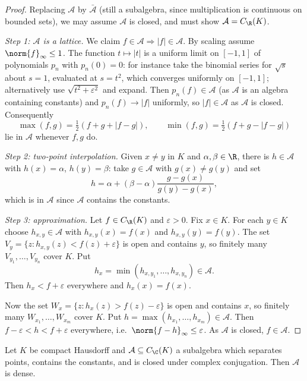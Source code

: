 \begin{proof}
	Replacing $\mathcal A$ by $\bar{\mathcal A}$ (still a subalgebra, since multiplication is continuous on bounded sets), we may assume $\mathcal{A}$ is closed, and must show $\mathcal{A} = C_\R(K)$.

	\emph{Step 1: $\mathcal A$ is a lattice.} We claim $f \in \mathcal{A} \Rightarrow |f| \in \mathcal{A}$. By scaling assume $\norm{f}_\infty \leq 1$. The function $t \mapsto |t|$ is a uniform limit on $[-1,1]$ of polynomials $p_n$ with $p_n(0)=0$: for instance take the binomial series for $\sqrt{s}$ about $s=1$, evaluated at $s = t^2$, which converges uniformly on $[-1,1]$; alternatively use $\sqrt{t^2 + \varepsilon^2}$ and expand. Then $p_n(f) \in \mathcal A$ (as $\mathcal A$ is an algebra containing constants) and $p_n(f)\to|f|$ uniformly, so $|f| \in \mathcal A$ as $\mathcal A$ is closed. Consequently
	$$\max(f,g) = \tfrac12(f+g+|f-g|), \qquad \min(f,g)=\tfrac12(f+g-|f-g|)$$
	lie in $\mathcal{A}$ whenever $f, g$ do.

	\emph{Step 2: two-point interpolation.} Given $x \neq y$ in $K$ and $\alpha,\beta \in \R$, there is $h \in \mathcal{A}$ with $h(x)=\alpha$, $h(y)=\beta$: take $g \in \mathcal{A}$ with $g(x)\neq g(y)$ and set
	$$h = \alpha + (\beta-\alpha)\frac{g - g(x)}{g(y)-g(x)},$$
	which is in $\mathcal{A}$ since $\mathcal A$ contains the constants.

	\emph{Step 3: approximation.} Let $f \in C_\R(K)$ and $\varepsilon > 0$. Fix $x \in K$. For each $y \in K$ choose $h_{x,y}\in\mathcal{A}$ with $h_{x,y}(x)=f(x)$ and $h_{x,y}(y)=f(y)$. The set $V_y = \{z : h_{x,y}(z) < f(z)+\varepsilon\}$ is open and contains $y$, so finitely many $V_{y_1},\dots,V_{y_n}$ cover $K$. Put
	$$h_x = \min(h_{x,y_1},\dots,h_{x,y_n}) \in \mathcal{A}.$$
	Then $h_x < f + \varepsilon$ everywhere and $h_x(x)=f(x)$.

	Now the set $W_x = \{z : h_x(z) > f(z)-\varepsilon\}$ is open and contains $x$, so finitely many $W_{x_1},\dots,W_{x_m}$ cover $K$. Put $h = \max(h_{x_1},\dots,h_{x_m}) \in \mathcal{A}$. Then $f - \varepsilon < h < f+\varepsilon$ everywhere, i.e.\ $\norm{f-h}_\infty \leq \varepsilon$. As $\mathcal A$ is closed, $f \in \mathcal{A}$.
\end{proof}

\begin{theorem}
	Let $K$ be compact Hausdorff and $\mathcal{A}\subseteq C_\C(K)$ a subalgebra which separates points, contains the constants, and is closed under complex conjugation. Then $\mathcal{A}$ is dense.
\end{theorem}

